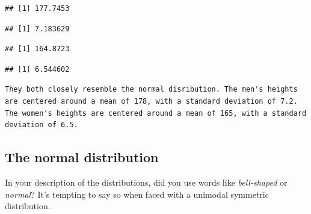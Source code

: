\documentclass[]{article}
\newenvironment{Shaded}{\begin{snugshade}}{\end{snugshade}}
\newcommand{\KeywordTok}[1]{\textcolor[rgb]{0.13,0.29,0.53}{\textbf{{#1}}}}
\newcommand{\NormalTok}[1]{{#1}}
\begin{document}
\begin{Shaded}
\end{Shaded}

\begin{verbatim}
## [1] 177.7453
\end{verbatim}

\begin{Shaded}
\end{Shaded}

\begin{verbatim}
## [1] 7.183629
\end{verbatim}

\begin{Shaded}
\end{Shaded}

\begin{verbatim}
## [1] 164.8723
\end{verbatim}

\begin{Shaded}
\end{Shaded}

\begin{verbatim}
## [1] 6.544602
\end{verbatim}

\begin{verbatim}
They both closely resemble the normal disribution. The men's heights are centered around a mean of 178, with a standard deviation of 7.2. The women's heights are centered around a mean of 165, with a standard deviation of 6.5.
\end{verbatim}

\subsection{The normal distribution}\label{the-normal-distribution}

In your description of the distributions, did you use words like
\emph{bell-shaped} or \emph{normal}? It's tempting to say so when faced
with a unimodal symmetric distribution.
\end{document}
